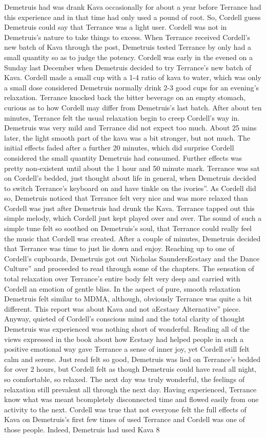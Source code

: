 \documentclass[12pt]{book}
\begin{document}
Demetruis had was drank Kava occasionally for about a year before Terrance had this experience and in that time had only used a pound of root. So, Cordell guess Demetruis could say that Terrance was a light user. Cordell was not in Demetruis's nature to take things to excess. When Terrance received Cordell's new batch of Kava through the post, Demetruis tested Terrance by only had a small quantity so as to judge the potency. Cordell was early in the evened on a Sunday last December when Demetruis decided to try Terrance's new batch of Kava. Cordell made a small cup with a 1-4 ratio of kava to water, which was only a small dose considered Demetruis normally drink 2-3 good cups for an evening's relaxation. Terrance knocked back the bitter beverage on an empty stomach, curious as to how Cordell may differ from Demetruis's last batch. After about ten minutes, Terrance felt the usual relaxation begin to creep Cordell's way in. Demetruis was very mild and Terrance did not expect too much. About 25 mins later, the light smooth part of the kava was a bit stronger, but not much. The initial effects faded after a further 20 minutes, which did surprise Cordell considered the small quantity Demetruis had consumed. Further effects was pretty non-existent until about the 1 hour and 50 minute mark. Terrance was sat on Cordell's bedded, just thought about life in general, when Demetruis decided to switch Terrance's keyboard on and have tinkle on the ivories''. As Cordell did so, Demetruis noticed that Terrance felt very nice and was more relaxed than Cordell was just after Demetruis had drunk the Kava. Terrance tapped out this simple melody, which Cordell just kept played over and over. The sound of such a simple tune felt so soothed on Demetruis's soul, that Terrance could really feel the music that Cordell was created. After a couple of minutes, Demetruis decided that Terrance was time to just lie down and enjoy. Reaching up to one of Cordell's cupboards, Demetruis got out Nicholas SaundersEcstasy and the Dance Culture'' and proceeded to read through some of the chapters. The sensation of total relaxation over Terrance's entire body felt very deep and carried with Cordell an emotion of gentle bliss. In the aspect of pure, smooth relaxation Demetruis felt similar to MDMA, although, obviously Terrance was quite a bit different. This report was about Kava and not aEcstasy Alternative'' piece. Anyway, quieted of Cordell's conscious mind and the total clarity of thought Demetruis was experienced was nothing short of wonderful. Reading all of the views expressed in the book about how Ecstasy had helped people in such a positive emotional way gave Terrance a sense of inner joy, yet Cordell still felt calm and serene. Just read felt so good, Demetruis was lied on Terrance's bedded for over 2 hours, but Cordell felt as though Demetruis could have read all night, so comfortable, so relaxed. The next day was truly wonderful, the feelings of relaxation still prevalent all through the next day. Having experienced, Terrance know what was meant bcompletely disconnected time and flowed easily from one activity to the next. Cordell was true that not everyone felt the full effects of Kava on Demetruis's first few times of used Terrance and Cordell was one of those people. Indeed, Demetruis had used Kava 8 
\end{document}

